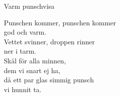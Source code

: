 \begin{song}{Varm punschvisa}
	
	Punschen kommer, punschen kommer\\
	god och varm.\\
	Vettet svinner, droppen rinner\\
	ner i tarm.\\
	Skål för alla minnen,\\
	dem vi snart ej ha,\\
	då ett par glas simmig punsch\\
	vi hunnit ta.
	
\end{song}
